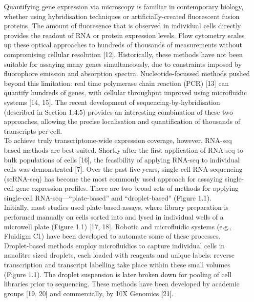 
Quantifying gene expression via microscopy is familiar in contemporary biology, whether using hybridisation techniques or artificially-created fluorescent fusion proteins. 
The amount of fluoresence that is observed in individual cells directly provides the readout of RNA or protein expression levels. 
Flow cytometry scales up these optical approaches to hundreds of thousands of measurements without compromising cellular resolution [12]. 
Historically, these methods have not been suitable for assaying many genes simultaneously, due to constraints imposed by fluorophore emission and absorption spectra. 
Nucleotide-focussed methods pushed beyond this limitation: real time polymerase chain reaction (PCR) [13] can quantify hundreds of genes, with cellular throughput improved using microfluidic systems [14, 15].
The recent development of sequencing-by-hybridisation (described in Section 1.4.5) provides an interesting combination of these two approaches, allowing the precise localisation and quantification of thousands of transcripts per-cell.\\

To achieve truly transcriptome-wide expression coverage, however, RNA-seq based methods are best suited. 
Shortly after the first application of RNA-seq to bulk populations of cells [16], the feasibility of applying RNA-seq to individual cells was demonstrated [7]. 
Over the past five years, single-cell RNA-sequencing (scRNA-seq) has become the most commonly used approach for assaying single-cell gene expression profiles. 
There are two broad sets of methods for applying single-cell RNA-seq—“plate-based” and “droplet-based” (Figure 1.1).\\

Initially, most studies used plate-based assays, where library preparation is performed manually on cells sorted into and lysed in individual wells of a microwell plate (Figure 1.1) [17, 18].
Robotic and microfluidic systems (e.g., Fluidigm C1) have been developed to automate some of these processes.\\

Droplet-based methods employ microfluidics to capture individual cells in nanolitre sized droplets, each loaded with reagents and unique labels: reverse transcription and transcript labelling take place within these small volumes (Figure 1.1). 
The droplet suspension is later broken down for pooling of cell libraries prior to sequencing. 
These methods have been developed by academic groups [19, 20] and commercially, by 10X Genomics [21].\\

